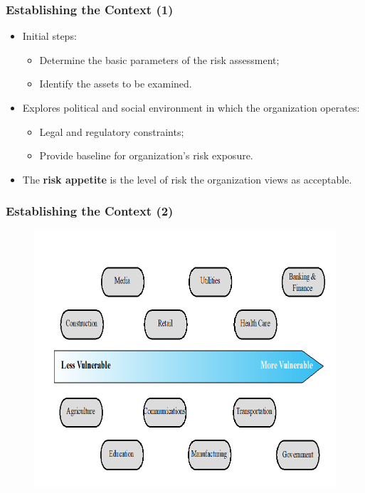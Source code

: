 \documentclass[xcolor ={table,usenames,dvipsnames}]{beamer}
\theoremstyle{definition}
\begin{document}
	\begin{frame}
		\frametitle{Establishing the Context (1)}
		\begin{itemize}
			\item	Initial steps: 
			\begin{itemize}
				\item Determine the basic parameters of the risk assessment;
				\item Identify the assets to be examined.
			\end{itemize}
			\item Explores political and social environment in which the organization operates: \begin{itemize}
				\item 	Legal and regulatory constraints;
				\item	Provide baseline for organization’s risk exposure.
			\end{itemize}
			\item The \textbf{risk appetite} is the level of risk the organization views as acceptable.
		\end{itemize}	
	\end{frame}

	\begin{frame}
		\frametitle{Establishing the Context (2)}
		\begin{figure}[h!]
			\centering
			\includegraphics[scale=0.45]{img/img_11.PNG}
			\label{Interfacce di un CS}
		\end{figure}
	\end{frame}
\end{document}
